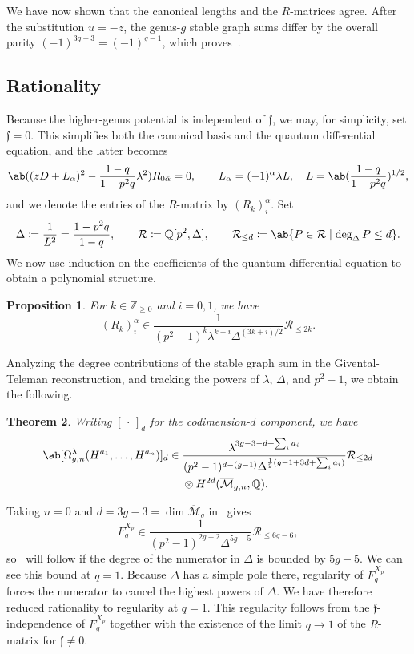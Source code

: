 \documentclass{amsart}
\newtheorem{thm}{Theorem}[section]
\newtheorem{prop}[thm]{Proposition}
\theoremstyle{definition}
\theoremstyle{remark}
\theoremstyle{plain}
\theoremstyle{definition}
\theoremstyle{remark}
\newcommand{\Z}{\mathbb{Z}}
\newcommand{\Q}{\mathbb{Q}}
\newcommand{\Mbar}{\overline{\mathcal{M}}}
\newcommand{\mc}[1]{\mathcal{#1}}
\newcommand{\mf}[1]{\mathfrak{#1}}
\newcommand{\1}{\mathbf{1}}
\newcommand{\2}{\mathbf{2}}
\newcommand{\3}{\mathbf{3}}
\begin{document}
We have now shown that the canonical lengths and the \(R\)-matrices agree. After the substitution \(u = -z\), the genus-\(g\) stable graph sums differ by the overall parity \((-1)^{3g-3} = (-1)^{g-1}\), which proves~.

\subsection{Rationality}%
\label{sub:Rationality}

Because the higher-genus potential is independent of \(\mf{f}\), we may, for simplicity, set \(\mf{f} = 0\). This simplifies both the canonical basis and the quantum differential equation, and the latter becomes
\[ \ab((zD+L_{\alpha})^2 - \frac{1-q}{1-p^2q}\lambda^2)R_{0\bar{\alpha}} = 0, \qquad L_{\alpha} = (-1)^{\alpha}\lambda L, \quad L = \ab(\frac{1-q}{1-p^2q})^{1/2}, \]
and we denote the entries of the \(R\)-matrix by \((R_k)_i^{\alpha}\). Set
\[ \Delta \coloneqq \frac{1}{L^2} = \frac{1-p^2q}{1-q}, \qquad \mc{R} \coloneqq \Q[p^2,\Delta], \qquad \mc{R}_{\leq d} \coloneqq \ab\{P \in \mc{R} \mid \deg_{\Delta} P \leq d\}. \]
We now use induction on the coefficients of the quantum differential equation to obtain a polynomial structure.

\begin{prop}%
\label{prop:R matrix polynomiality}
    For \(k \in \Z_{\geq0}\) and \(i = 0,1\), we have
    \[ (R_k)_i^{\alpha} \in \frac{1}{(p^2-1)^k \lambda^{k-i}\Delta^{(3k+i)/2}}\mc{R}_{\leq 2k}. \]
\end{prop}

Analyzing the degree contributions of the stable graph sum in the Givental-Teleman reconstruction, and tracking the powers of \(\lambda\), \(\Delta\), and \(p^2-1\), we obtain the following.

\begin{thm}%
\label{thm:local P1 reconstruction}
    Writing \([\,\cdot\,]_d\) for the codimension-\(d\) component, we have
    \begin{align*}
        \ab[\Omega^{\lambda}_{g,n}(H^{a_1},\ldots,H^{a_n})]_d \in{}& \frac{\lambda^{3g-3-d+\sum_i a_i}}{(p^2-1)^{d-(g-1)}\Delta^{\frac{1}{2}(g-1+3d+\sum_i a_i)}}\mc{R}_{\leq 2d} \\
        &\otimes H^{2d}(\Mbar_{g,n},\Q).
    \end{align*}
\end{thm}

Taking \(n=0\) and \(d = 3g-3 = \dim \Mbar_g\) in~ gives
\[ F_g^{X_p} \in \frac{1}{(p^2-1)^{2g-2}\Delta^{5g-5}}\mc{R}_{\leq 6g-6}, \]
so~ will follow if the degree of the numerator in \(\Delta\) is bounded by \(5g-5\). We can see this bound at \(q=1\). Because \(\Delta\) has a simple pole there, regularity of \(F_g^{X_p}\) forces the numerator to cancel the highest powers of \(\Delta\). We have therefore reduced rationality to regularity at \(q=1\). This regularity follows from the \(\mf{f}\)-independence of \(F_g^{X_p}\) together with the existence of the limit \(q \to 1\) of the \(R\)-matrix for \(\mf{f} \neq 0\).
\end{document}
